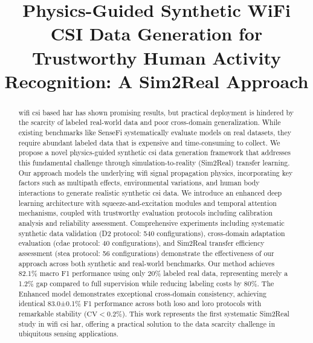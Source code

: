 \documentclass[journal]{IEEEtran}
\begin{document}
\title{Physics-Guided Synthetic WiFi CSI Data Generation for Trustworthy Human Activity Recognition: A Sim2Real Approach}

\author{
}

\maketitle

\begin{abstract}
\gls{wifi} \gls{csi} based \gls{har} has shown promising results, but practical deployment is hindered by the scarcity of labeled real-world data and poor cross-domain generalization. While existing benchmarks like SenseFi systematically evaluate models on real datasets, they require abundant labeled data that is expensive and time-consuming to collect. We propose a novel physics-guided synthetic \gls{csi} data generation framework that addresses this fundamental challenge through simulation-to-reality (Sim2Real) transfer learning. Our approach models the underlying \gls{wifi} signal propagation physics, incorporating key factors such as multipath effects, environmental variations, and human body interactions to generate realistic synthetic \gls{csi} data. We introduce an enhanced deep learning architecture with squeeze-and-excitation modules and temporal attention mechanisms, coupled with trustworthy evaluation protocols including calibration analysis and reliability assessment. Comprehensive experiments including systematic synthetic data validation (D2 protocol: 540 configurations), cross-domain adaptation evaluation (\gls{cdae} protocol: 40 configurations), and Sim2Real transfer efficiency assessment (\gls{stea} protocol: 56 configurations) demonstrate the effectiveness of our approach across both synthetic and real-world benchmarks. Our method achieves 82.1\% macro F1 performance using only 20\% labeled real data, representing merely a 1.2\% gap compared to full supervision while reducing labeling costs by 80\%. The Enhanced model demonstrates exceptional cross-domain consistency, achieving identical 83.0±0.1\% F1 performance across both \gls{loso} and \gls{loro} protocols with remarkable stability ($\text{CV}<0.2\%$). This work represents the first systematic Sim2Real study in \gls{wifi} \gls{csi} \gls{har}, offering a practical solution to the data scarcity challenge in ubiquitous sensing applications.
\end{abstract}
\end{document}
